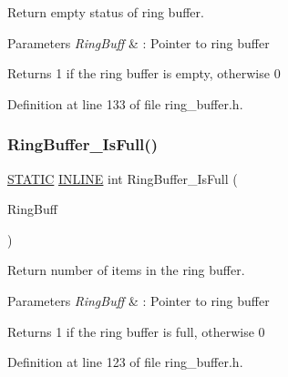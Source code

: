 Return empty status of ring buffer. 


\begin{DoxyParams}{Parameters}
{\em Ring\+Buff} & \+: Pointer to ring buffer \\
\hline
\end{DoxyParams}
\begin{DoxyReturn}{Returns}
1 if the ring buffer is empty, otherwise 0 
\end{DoxyReturn}


Definition at line 133 of file ring\+\_\+buffer.\+h.

\mbox{\label{group___ring___buffer_ga760da012435262add1d8d7aa79e873a0}} 
\subsubsection{\texorpdfstring{Ring\+Buffer\+\_\+\+Is\+Full()}{RingBuffer\_IsFull()}}
{\footnotesize\ttfamily \hyperlink{group___l_p_c___types___public___macros_ga10b2d890d871e1489bb02b7e70d9bdfb}{S\+T\+A\+T\+IC} \hyperlink{spifi__18xx__43xx_8h_a2eb6f9e0395b47b8d5e3eeae4fe0c116}{I\+N\+L\+I\+NE} int Ring\+Buffer\+\_\+\+Is\+Full (\begin{DoxyParamCaption}\item[{\hyperlink{struct_r_i_n_g_b_u_f_f___t}{R\+I\+N\+G\+B\+U\+F\+F\+\_\+T} $\ast$}]{Ring\+Buff }\end{DoxyParamCaption})}



Return number of items in the ring buffer. 


\begin{DoxyParams}{Parameters}
{\em Ring\+Buff} & \+: Pointer to ring buffer \\
\hline
\end{DoxyParams}
\begin{DoxyReturn}{Returns}
1 if the ring buffer is full, otherwise 0 
\end{DoxyReturn}


Definition at line 123 of file ring\+\_\+buffer.\+h.

\mbox{\label{group___ring___buffer_gaf3ce7f43677c2b4c6eedb3cc4962b80d}} 
